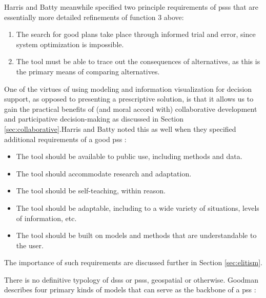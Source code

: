 Harris and Batty meanwhile specified two principle requirements of \acp{pss} \cite{harrisLocationalModelsGeographic1993} that are essentially more detailed refinements of function 3 above:
\begin{enumerate}[itemsep=0pt,parsep=0pt]
	\item{The search for good plans take place through informed trial and error, since system optimization is impossible.}
	\item{The tool must be able to trace out the consequences of alternatives, as this is the primary means of comparing alternatives.}
\end{enumerate}

One of the virtues of using modeling and information visualization for decision support, as opposed to presenting a prescriptive solution, is that it allows us to gain the practical benefits of (and moral accord with) collaborative development and participative decision-making as discussed in Section \ref{sec:collaborative}.Harris and Batty noted this as well when they specified additional requirements of a good \ac{pss} \cite{harrisLocationalModelsGeographic1993}:

\begin{itemize}[itemsep=0pt,parsep=0pt]
	\item{The tool should be available to public use, including methods and data.}
	\item{The tool should accommodate research and adaptation.}
	\item{The tool should be self-teaching, within reason.}
	\item{The tool should be adaptable, including to a wide variety of situations, levels of information, etc.}
	\item{The tool should be built on models and methods that are understandable to the user.}
\end{itemize}

The importance of such requirements are discussed further in Section \ref{sec:elitism}.

There is no definitive typology of \acp{dss} or \acp{pss}, geospatial or otherwise. Goodman describes four primary kinds of models that can serve as the backbone of a \ac{pss} \cite{goodspeedScenarioPlanningCities2020}: 

